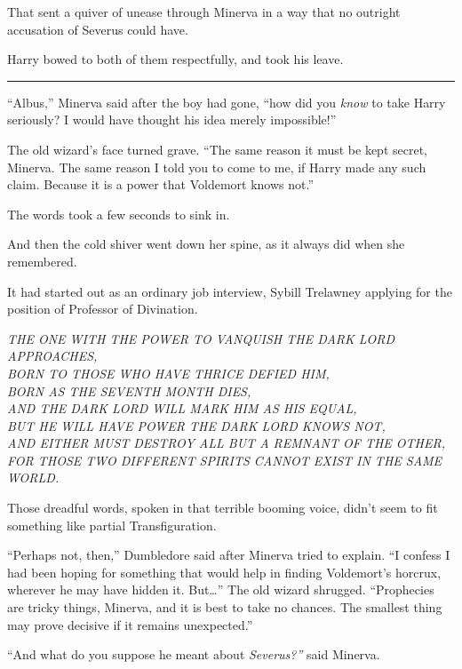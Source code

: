 That sent a quiver of unease through Minerva in a way that no outright
accusation of Severus could have.

Harry bowed to both of them respectfully, and took his leave.

\begin{center}\rule{3in}{0.4pt}\end{center}

``Albus,'' Minerva said after the boy had gone, ``how did you
\emph{know} to take Harry seriously? I would have thought his idea
merely impossible!''

The old wizard's face turned grave. ``The same reason it must be kept
secret, Minerva. The same reason I told you to come to me, if Harry made
any such claim. Because it is a power that Voldemort knows not.''

The words took a few seconds to sink in.

And then the cold shiver went down her spine, as it always did when she
remembered.

It had started out as an ordinary job interview, Sybill Trelawney
applying for the position of Professor of Divination.

\emph{THE ONE WITH THE POWER TO VANQUISH THE DARK LORD
APPROACHES,}\\\emph{BORN TO THOSE WHO HAVE THRICE DEFIED
HIM,}\\\emph{BORN AS THE SEVENTH MONTH DIES,}\\\emph{AND THE DARK LORD
WILL MARK HIM AS HIS EQUAL,}\\\emph{BUT HE WILL HAVE POWER THE DARK LORD
KNOWS NOT,}\\\emph{AND EITHER MUST DESTROY ALL BUT A REMNANT OF THE
OTHER,}\\\emph{FOR THOSE TWO DIFFERENT SPIRITS CANNOT EXIST IN THE SAME
WORLD.}

Those dreadful words, spoken in that terrible booming voice, didn't seem
to fit something like partial Transfiguration.

``Perhaps not, then,'' Dumbledore said after Minerva tried to explain.
``I confess I had been hoping for something that would help in finding
Voldemort's horcrux, wherever he may have hidden it. But\ldots{}'' The
old wizard shrugged. ``Prophecies are tricky things, Minerva, and it is
best to take no chances. The smallest thing may prove decisive if it
remains unexpected.''

``And what do you suppose he meant about \emph{Severus?''} said Minerva.

